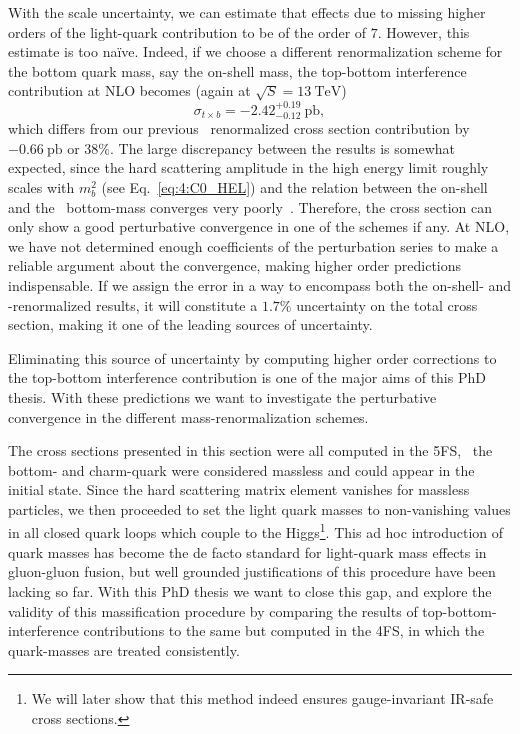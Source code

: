 With the scale uncertainty, we can estimate that effects due to missing higher orders of the light-quark contribution to be of the order of $7$\textperthousand. However, this estimate is too na\"ive. Indeed, if we choose a different renormalization scheme for the bottom quark mass, say the on-shell mass, the top-bottom interference contribution at \acs{NLO} becomes (again at $\sqrt{S} = 13\ \mathrm{TeV}$)
\begin{equation}
\sigma_{t \times b} = -2.42^{+0.19}_{-0.12}\ \mathrm{pb},
\end{equation}
which differs from our previous \MS\ renormalized cross section contribution by $-0.66\ \mathrm{pb}$ or $38\%$. The large discrepancy between the results is somewhat expected, since the hard scattering amplitude in the high energy limit roughly scales with $m_b^2$ (see Eq.~\eqref{eq:4:C0_HEL}) and the relation between the on-shell and the \MS\ bottom-mass converges very poorly~\cite{Marquard:2015qpa, Marquard:2016vmy}. Therefore, the cross section can only show a good perturbative convergence in one of the schemes if any. At \acs{NLO}, we have not determined enough coefficients of the perturbation series to make a reliable argument about the convergence, making higher order predictions indispensable. If we assign the error in a way to encompass both the on-shell- and \MS-renormalized results, it will constitute a $1.7\%$ uncertainty on the total cross section, making it one of the leading sources of uncertainty.

Eliminating this source of uncertainty by computing higher order corrections to the top-bottom interference contribution is one of the major aims of this PhD thesis. With these predictions we want to investigate the perturbative convergence in the different mass-renormalization schemes.

The cross sections presented in this section were all computed in the 5\acs{FS}, \ie\ the bottom- and charm-quark were considered massless and could appear in the initial state. Since the hard scattering matrix element vanishes for massless particles, we then proceeded to set the light quark masses to non-vanishing values in all closed quark loops which couple to the Higgs\footnote{We will later show that this method indeed ensures gauge-invariant \acs{IR}-safe cross sections.}. This ad hoc introduction of quark masses has become the de facto standard for light-quark mass effects in gluon-gluon fusion, but well grounded justifications of this procedure have been lacking so far. With this PhD thesis we want to close this gap, and explore the validity of this massification procedure by comparing the results of top-bottom-interference contributions to the same but computed in the 4\acs{FS}, in which the quark-masses are treated consistently.

